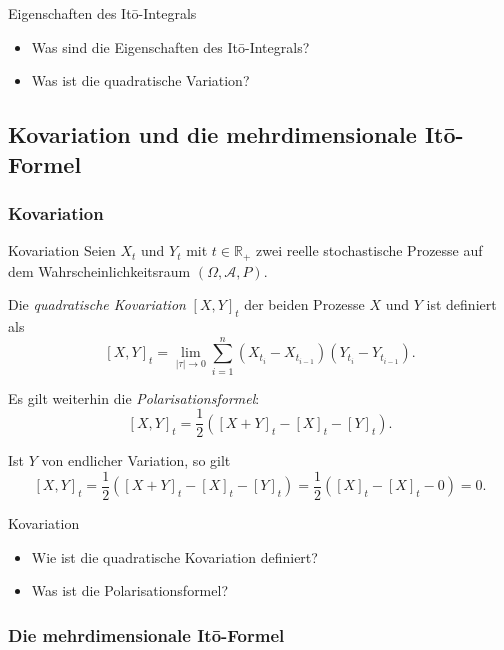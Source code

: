 \begin{info}{Eigenschaften des Itō-Integrals}
    \begin{itemize}
        \item Was sind die Eigenschaften des Itō-Integrals?
        \item Was ist die quadratische Variation?
    \end{itemize}
\end{info}

\subsection{Kovariation und die mehrdimensionale Itō-Formel}

\subsubsection{Kovariation}

\begin{defi}{Kovariation}
    Seien $X_t$ und $Y_t$ mit $t \in \mathbb{R}_{+}$ zwei reelle stochastische Prozesse auf dem Wahrscheinlichkeitsraum $(\Omega ,{\mathcal{A}},P)$.

    Die \emph{quadratische Kovariation} $[X,Y]_{t}$ der beiden Prozesse $X$ und $Y$ ist definiert als
    \[
        [X,Y]_{t} = \lim_{|\tau |\to 0} \sum_{i=1}^{n} (X_{t_{i}}-X_{t_{i-1}})(Y_{t_{i}}-Y_{t_{i-1}}).
    \]

    Es gilt weiterhin die \emph{Polarisationsformel}:
    \[
        [X,Y]_{t} = \frac{1}{2} ([X+Y]_{t} - [X]_{t} - [Y]_{t}).
    \]

    Ist $Y$ von endlicher Variation, so gilt
    \[
        [X,Y]_{t} = \frac{1}{2} ([X+Y]_{t} - [X]_{t} - [Y]_{t}) = \frac{1}{2} ([X]_{t} - [X]_{t} - 0) = 0.
    \]
\end{defi}

\begin{info}{Kovariation}
    \begin{itemize}
        \item Wie ist die quadratische Kovariation definiert?
        \item Was ist die Polarisationsformel?
    \end{itemize}
\end{info}

\subsubsection{Die mehrdimensionale Itō-Formel}

